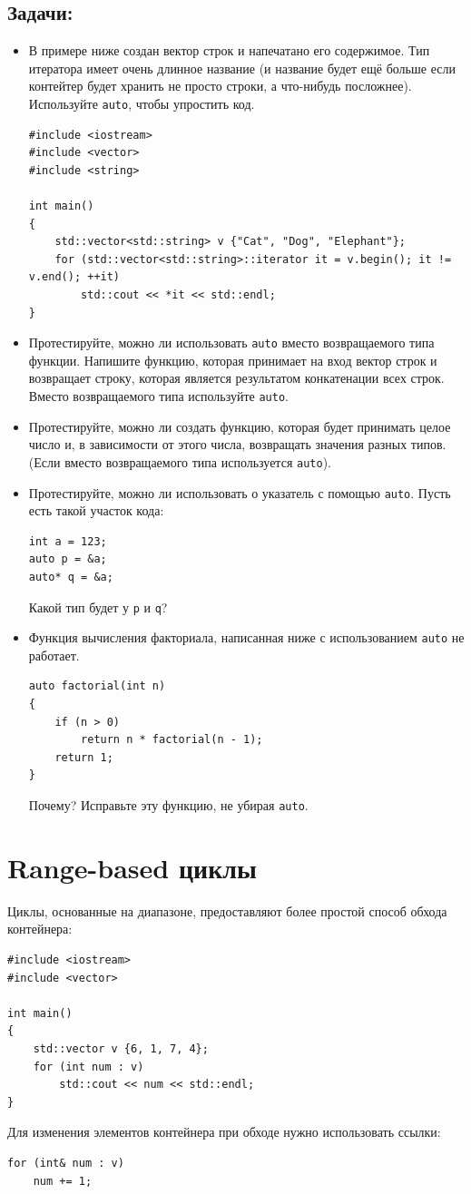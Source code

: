 \documentclass{article}
\begin{document}
\subsection*{Задачи:}
\begin{itemize}
\item В примере ниже создан вектор строк и напечатано его содержимое. Тип итератора имеет очень длинное название (и название будет ещё больше если контейтер будет хранить не просто строки, а что-нибудь посложнее). Используйте \texttt{auto}, чтобы упростить код.
\begin{lstlisting}
#include <iostream>
#include <vector>
#include <string>

int main() 
{
    std::vector<std::string> v {"Cat", "Dog", "Elephant"};
    for (std::vector<std::string>::iterator it = v.begin(); it != v.end(); ++it)
    	std::cout << *it << std::endl;    
}
\end{lstlisting}

\item Протестируйте, можно ли использовать \texttt{auto} вместо возвращаемого типа функции. Напишите функцию, которая принимает на вход вектор строк и возвращает строку, которая является результатом конкатенации всех строк. Вместо возвращаемого типа используйте \texttt{auto}.
\item Протестируйте, можно ли создать функцию, которая будет принимать целое число и, в зависимости от этого числа, возвращать значения разных типов. (Если вместо возвращаемого типа используется \texttt{auto}).

\item Протестируйте, можно ли использовать о указатель с помощью \texttt{auto}. Пусть есть такой участок кода:
\begin{lstlisting}
int a = 123;
auto p = &a;
auto* q = &a;
\end{lstlisting}
Какой тип будет у \texttt{p} и \texttt{q}?
\item Функция вычисления факториала, написанная ниже с использованием \texttt{auto} не работает. 
\begin{lstlisting}
auto factorial(int n) 
{
    if (n > 0)
        return n * factorial(n - 1);
    return 1;
}
\end{lstlisting}
Почему? Исправьте эту функцию, не убирая \texttt{auto}.
\end{itemize}



\newpage
\section*{Range-based циклы}
Циклы, основанные на диапазоне, предоставляют более простой способ обхода контейнера:
\begin{lstlisting}
#include <iostream>
#include <vector>

int main()
{
    std::vector v {6, 1, 7, 4};
    for (int num : v)
    	std::cout << num << std::endl;    
}
\end{lstlisting}
Для изменения элементов контейнера при обходе нужно использовать ссылки:
\begin{lstlisting}
for (int& num : v)
    num += 1;    
\end{lstlisting}
\end{document}
